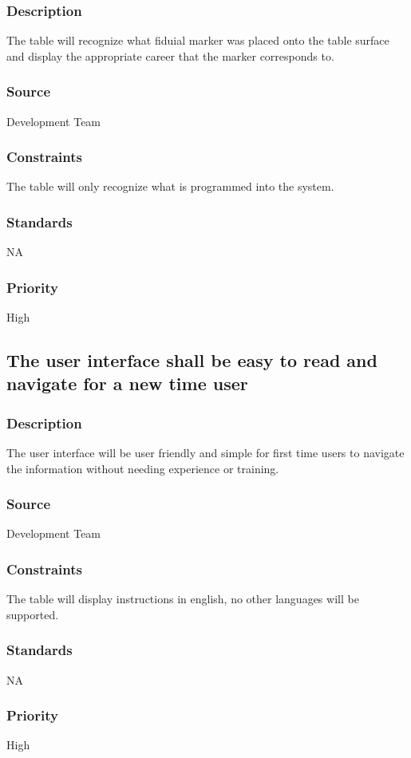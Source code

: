 \subsubsection{Description}
The table will recognize what fiduial marker was placed onto the table surface and display the appropriate career that the marker corresponds to.
\subsubsection{Source}
Development Team
\subsubsection{Constraints}
The table will only recognize what is programmed into the system. 
\subsubsection{Standards}
NA
\subsubsection{Priority}
High

\subsection{The user interface shall be easy to read and navigate for a new time user }
\subsubsection{Description}
The user interface will be user friendly and simple for first time users to navigate the information without needing experience or training.
\subsubsection{Source}
Development Team
\subsubsection{Constraints}
The table will display instructions in english, no other languages will be supported. 
\subsubsection{Standards}
NA
\subsubsection{Priority}
High

